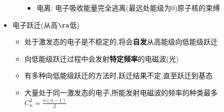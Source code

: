 \documentclass{article}
\begin{document}
\begin{itemize}
\begin{itemize}
\begin{minipage}{0.52\textwidth}
\begin{itemize}
                          \item 电离: 电子吸收能量完全逃离(最远处能级为$0$)原子核的束缚
                      \end{itemize}
                  \end{minipage}
          \end{itemize}
    \item 电子跃迁(从高$\ra$低)
          \begin{itemize}
              \item 处于激发态的电子是不稳定的,将会\textbf{自发}从高能级向低能级跃迁
              \item 向低能级跃迁过程中会发射\textbf{特定频率}的电磁波(光)
              \item 有多种向低能级跃迁的方法时,跃迁结果不定,直至跃迁到基态
              \item 大量处于同一激发态的电子,所能发射电磁波的频率的种类最多$C_{n}^{2} = \frac{n(n-1)}{2}$
          \end{itemize}
\end{itemize}

\vspace{2em}
\end{document}
